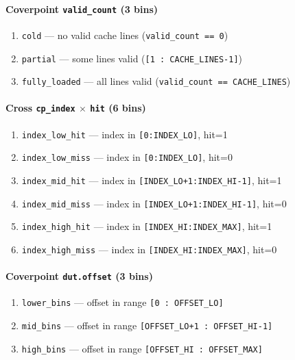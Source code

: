 \documentclass[11pt]{article}
\begin{document}
\paragraph*{Coverpoint \texttt{valid\_count} (3 bins)}
\begin{enumerate}[resume, label=\arabic*.]
  \item \texttt{cold} --- no valid cache lines (\texttt{valid\_count == 0})
  \item \texttt{partial} --- some lines valid (\texttt{[1 : CACHE\_LINES-1]})
  \item \texttt{fully\_loaded} --- all lines valid (\texttt{valid\_count == CACHE\_LINES})
\end{enumerate}

\paragraph*{Cross \texttt{cp\_index} $\times$ \texttt{hit} (6 bins)}
\begin{enumerate}[resume, label=\arabic*.]
  \item \texttt{index\_low\_hit} --- index in \texttt{[0:INDEX\_LO]}, hit=1
  \item \texttt{index\_low\_miss} --- index in \texttt{[0:INDEX\_LO]}, hit=0
  \item \texttt{index\_mid\_hit} --- index in \texttt{[INDEX\_LO+1:INDEX\_HI-1]}, hit=1
  \item \texttt{index\_mid\_miss} --- index in \texttt{[INDEX\_LO+1:INDEX\_HI-1]}, hit=0
  \item \texttt{index\_high\_hit} --- index in \texttt{[INDEX\_HI:INDEX\_MAX]}, hit=1
  \item \texttt{index\_high\_miss} --- index in \texttt{[INDEX\_HI:INDEX\_MAX]}, hit=0
\end{enumerate}

\paragraph*{Coverpoint \texttt{dut.offset} (3 bins)}
\begin{enumerate}[resume, label=\arabic*.]
  \item \texttt{lower\_bins} --- offset in range \texttt{[0 : OFFSET\_LO]}
  \item \texttt{mid\_bins} --- offset in range \texttt{[OFFSET\_LO+1 : OFFSET\_HI-1]}
  \item \texttt{high\_bins} --- offset in range \texttt{[OFFSET\_HI : OFFSET\_MAX]}
\end{enumerate}
\end{document}
